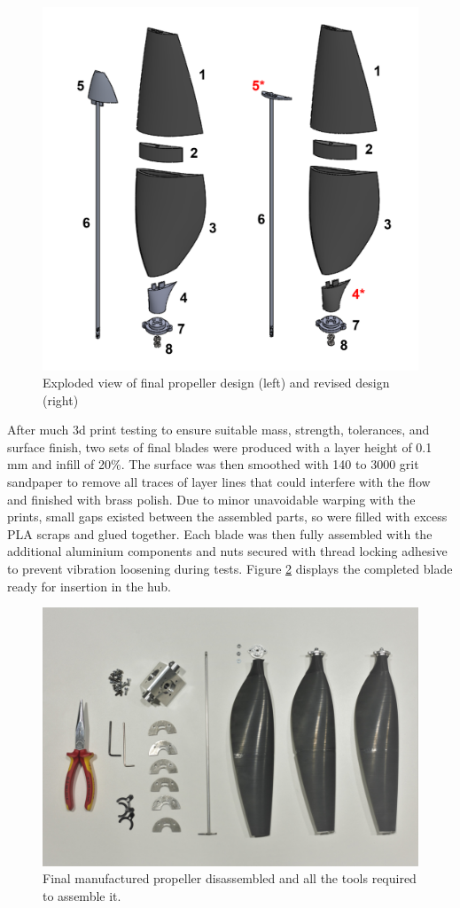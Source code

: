 \begin{figure}[!htbp]
    \centering
    \includegraphics[width=0.7\linewidth]{images/part6/propExploded.png}
    \caption{Exploded view of final propeller design (left) and revised design (right)}
\label{fig:propExploded}
\end{figure}



After much 3d print testing to ensure suitable mass, strength, tolerances, and surface finish, two sets of final blades were produced with a layer height of 0.1 mm and infill of 20\%. The surface was then smoothed with 140 to 3000 grit sandpaper to remove all traces of layer lines that could interfere with the flow and finished with brass polish. Due to minor unavoidable warping with the prints, small gaps existed between the assembled parts, so were filled with excess PLA scraps and glued together. Each blade was then fully assembled with the additional aluminium components and nuts secured with thread locking adhesive to prevent vibration loosening during tests. Figure \ref{fig:bladeComplete} displays the completed blade ready for insertion in the hub.

\begin{figure}[!htbp]
    \centering
    \includegraphics[width=0.7\linewidth, angle=180]{images/part6/buggabugga.jpg}
    \caption{Final manufactured propeller disassembled and all the tools required to assemble it.}
\label{fig:bladeComplete}
\end{figure}

